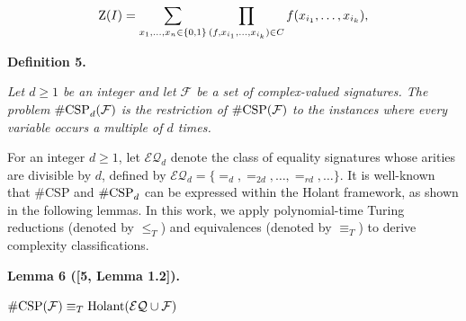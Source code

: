 \[\begin{gathered}
\text{Z}(I)=\sum_{\begin{subarray}{c}x_{1},\ldots,x_{n}\in\{0,1\}\end{subarray}}\prod_{(f,x_{i_{1}},\ldots,x_{i_{k}})\in C}f(x_{i_{1}},\ldots,x_{i_{k}}),
\end{gathered}\]







\par\medskip\noindent\textbf{
\textbf{Definition 5}\textbf{.}
}\par



\emph{Let $d\geq 1$ be an integer and let $\mathcal{F}$ be a set of complex-valued signatures. The problem $\textup{{\#CSP}}_{d}(\mathcal{F})$ is the restriction of $\textup{{\#CSP}}(\mathcal{F})$ to the instances where every variable occurs a multiple of $d$ times.}\par






For an integer $d\geq 1$, let $\mathcal{EQ}_{d}$ denote the class of equality signatures whose arities are divisible by $d$, defined by $\mathcal{EQ}_{d}=\{=_{d},=_{2d},\ldots,=_{rd},\ldots\}$. It is well-known that \#CSP and $\textup{{\#CSP}}_{d}$ can be expressed within the Holant framework, as shown in the following lemmas. In this work, we apply polynomial-time Turing reductions (denoted by $\leq_{T}$) and equivalences (denoted by $\equiv_{T}$) to derive complexity classifications.\par





\par\medskip\noindent\textbf{
\textbf{Lemma 6}\textbf{ }([5, Lemma 1.2])\textbf{.}
}\par



$\#\textup{{CSP}}(\mathcal{F})\equiv_{T}\textup{{Holant}}(\mathcal{EQ}\cup\mathcal{F})$\emph{}\par







